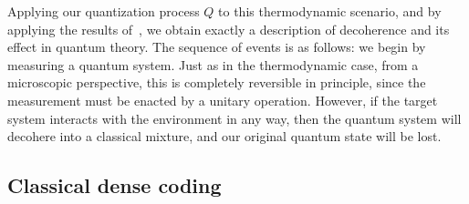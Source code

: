 \documentclass[a4paper,12pt]{article}
\theoremstyle{definition}
\renewcommand{\-}[0]{\nobreakdash-\hspace{0pt}}
\begin{document}
Applying our quantization process $Q$ to this thermodynamic scenario, and by applying the results of~\cite{v12-hqt, v12-hsqp},  we obtain exactly a description of decoherence and its effect in quantum theory. The sequence of events is as follows: we begin by measuring a quantum system. Just as in the thermodynamic case, from a microscopic perspective, this is completely reversible in principle, since the measurement must be enacted by a unitary operation. However, if the target system interacts with the environment in any way, then the quantum system will decohere into a classical mixture, and our original quantum state will be lost.

\subsection{Classical dense coding}
\label{sec:densecoding}
\end{document}
